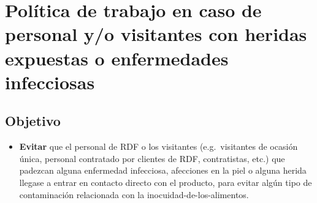 \thispagestyle{formato-PI}
\renewcommand{\MayorVer}{2}
\renewcommand{\MenorVer}{0}

\renewcommand{\Codigo}{BPD-8-POL}
\renewcommand{\FechaPub}{2023--01}



\renewcommand{\Titulo}{\small{Política de personal y/o visitantes con heridas expuestas o enfermedades infecciosas}}
\section{Política de trabajo en caso de personal y/o visitantes con heridas expuestas o enfermedades infecciosas}
\subsection{Objetivo}

\begin{itemize}
	\item \textbf{Evitar} que el personal de \gls{RDF} o los visitantes (e.g.\ visitantes de ocasión única, personal contratado por clientes de \gls{RDF}, contratistas, etc.) que padezcan alguna enfermedad infecciosa, afecciones en la piel o alguna herida llegase a entrar en contacto directo con el producto, para evitar algún tipo de contaminación relacionada con la \gls{inocuidad-de-los-alimentos}.
\end{itemize}

